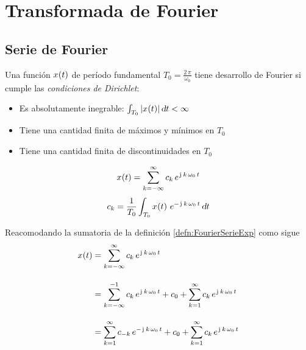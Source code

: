 \chapter{Transformada de Fourier}


\section{Serie de Fourier}

Una función $\fx[x]{t}$ de período fundamental $T_0 = \frac{2 \, \pi}{\omega_0}$ tiene desarrollo de Fourier si cumple las \emph{condiciones de Dirichlet}:
\begin{itemize}
    \item Es absolutamente inegrable: $\int_{T_0} \norm{\fx[x]{t}} \, \dif t < \infty$
    \item Tiene una cantidad finita de máximos y mínimos en $T_0$
    \item Tiene una cantidad finita de discontinuidades en $T_0$
\end{itemize}

\begin{mdframed}[style=DefinitionFrame]
    \begin{defn}
        \label{defn:FourierSerieExp}
    \end{defn}
    \begin{equation*}
        \fx[x]{t} = \sum_{\kth=-\infty}^\infty c_\kth \, e^{\iu \, \kth \, \omega_0 \, t}
    \end{equation*}
    \begin{equation*}
        c_\kth = \frac{1}{T_0} \int_{T_0} \fx[x]{t} \, e^{-\iu \, \kth \, \omega_0 \, t} \, \dif t
    \end{equation*}
\end{mdframed}

Reacomodando la sumatoria de la definición \ref{defn:FourierSerieExp} como sigue
\begin{align*}
    \fx[x]{t} &=
    \sum_{\kth=-\infty}^\infty c_\kth \, e^{\iu \, \kth \, \omega_0 \, t}
    \\[1em]
    &= \sum_{\kth=-\infty}^{-1} c_\kth \, e^{\iu \, \kth \, \omega_0 \, t} + c_0 + \sum_{\kth=1}^{\infty} c_\kth \, e^{\iu \, \kth \, \omega_0 \, t}
    \\[1em]
    &= \sum_{\kth=1}^{\infty} c_{-\kth} \, e^{-\iu \, \kth \, \omega_0 \, t} + c_0 + \sum_{\kth=1}^{\infty} c_\kth \, e^{\iu \, \kth \, \omega_0 \, t}
\end{align*}

